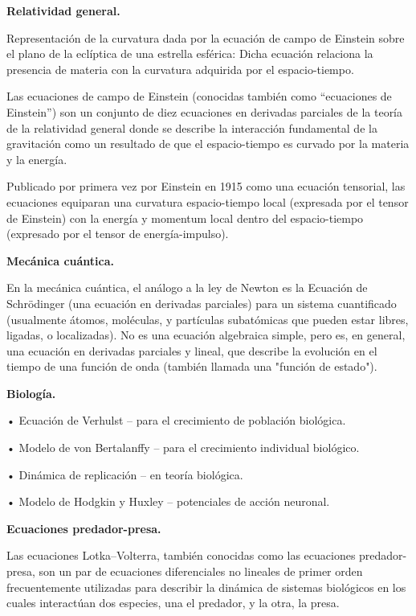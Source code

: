 \textcolor{ForestGreen!80}{\textbf{Relatividad general.}}

\textcolor{ForestGreen!80}{Representación de la curvatura dada por la ecuación de campo de Einstein sobre el plano de la eclíptica de una estrella esférica: Dicha ecuación relaciona la presencia de materia con la curvatura adquirida por el espacio-tiempo.}

\textcolor{ForestGreen!80}{Las ecuaciones de campo de Einstein (conocidas también como ``ecuaciones de Einstein'') son un conjunto de diez ecuaciones en derivadas parciales de la teoría de la relatividad general donde se describe la interacción fundamental de la gravitación como un resultado de que el espacio-tiempo es curvado por la materia y la energía.}
 
\textcolor{ForestGreen!80}{Publicado por primera vez por Einstein en 1915 como una ecuación tensorial, las ecuaciones equiparan una curvatura espacio-tiempo local (expresada por el tensor de Einstein) con la energía y momentum local dentro del espacio-tiempo (expresado por el tensor de energía-impulso).}

\textcolor{ForestGreen!80}{\textbf{Mecánica cuántica.}}

\textcolor{ForestGreen!80}{En la mecánica cuántica, el análogo a la ley de Newton es la Ecuación de Schrödinger (una ecuación en derivadas parciales) para un sistema cuantificado (usualmente átomos, moléculas, y partículas subatómicas que pueden estar libres, ligadas, o localizadas). No es una ecuación algebraica simple, pero es, en general, una ecuación en derivadas parciales y lineal, que describe la evolución en el tiempo de una función de onda (también llamada una "función de estado").}

\textcolor{ForestGreen!80}{\textbf{Biología.}}
 
\textcolor{ForestGreen!80}{•	Ecuación de Verhulst – para el crecimiento de población biológica.}
 
\textcolor{ForestGreen!80}{•	Modelo de von Bertalanffy – para el crecimiento individual biológico.}
 
\textcolor{ForestGreen!80}{•	Dinámica de replicación – en teoría biológica.}
 
\textcolor{ForestGreen!80}{•	Modelo de Hodgkin y Huxley – potenciales de acción neuronal.}
	
\textcolor{ForestGreen!80}{\textbf{Ecuaciones predador-presa.}}

\textcolor{ForestGreen!80}{Las ecuaciones Lotka–Volterra, también conocidas como las ecuaciones predador-presa, son un par de ecuaciones diferenciales no lineales de primer orden frecuentemente utilizadas para describir la dinámica de sistemas biológicos en los cuales interactúan dos especies, una el predador, y la otra, la presa. }

